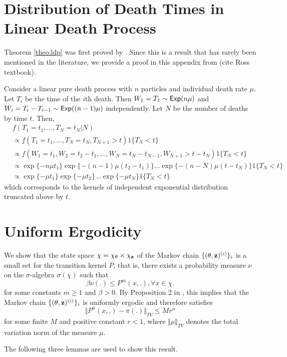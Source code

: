 \documentclass[11pt]{article}
\begin{document}
			
	\appendix
	
	\section{Distribution of Death Times in Linear Death Process}
	\label{app:ldp}
	Theorem \ref{theo:ldp} was first proved by \cite{Neuts.1971}. Since this is a result that has rarely been mentioned in the literature, we provide a proof in this appendix from (cite Ross textbook).
	
	Consider a linear pure death process with $n$ particles and individual death rate $\mu$.
	Let $T_i$ be the time of the $i$th death. Then $W_1 = T_1 \sim \textsf{Exp}(n\mu)$ and $W_i = T_i - T_{i-1} \sim \textsf{Exp}((n-1)\mu)$ independently. Let $N$ be the number of deaths by time $t$. Then, 
	\begin{align*}
		& f(T_1 = t_1, \dots, T_N = t_N | N) \\
		& \propto f(T_1 = t_1, \dots, T_N = t_N, T_{N+1} > t) 1\{T_N < t\}\\
		& \propto f(W_1 = t_1, W_2 = t_2 - t_1, \dots, W_N = t_N - t_{N-1}, W_{N+1} > t - t_N) 1\{T_N < t\}\\
		& \propto \exp\{-n\mu t_1\} \exp\{-(n-1)\mu(t_2-t_1)\}\dots \exp\{-(n-N)\mu(t - t_N)\} 1\{T_N < t\}\\
		& \propto \exp\{-\mu t_1\}\exp\{-\mu t_2\} \dots \exp\{-\mu t_N\} 1\{T_N < t\}
	\end{align*}
which corresponds to the kernels of independent exponential distribution truncated above by $t$.

	
	\section{Uniform Ergodicity}
	\label{app:uni}
	We show that the state space $\chi = \chi_{\theta}\times\chi_{\mathbf{z}}$ of the Markov chain $\{(\theta, \mathbf{z})^{(i)}\}_i$ is a small set for the transition kernel $P$, that is, there exists a probability measure $\nu$ on the $\sigma$-algebra $\sigma(\chi)$ such that
	$$\beta \nu(.) \le P^m(x,.), \forall x\in \chi.$$
	for some constants $m \ge 1$ and $\beta > 0$.
	By Proposition 2 in \cite{Tierney.1994}, this implies that the Markov chain $\{(\theta, \mathbf{z})^{(i)}\}_i$ is uniformly ergodic and therefore satisfies
	$$
	\Vert P^n(x,.)-\pi(.)\Vert_{TV} \le M r^n
	$$
	for some finite $M$ and positive constant $r<1$, where $\Vert \mu \Vert_{TV}$ denotes the total variation norm of the measure $\mu$.
	
	The following three lemmas are used to show this result.
	
\end{document}
